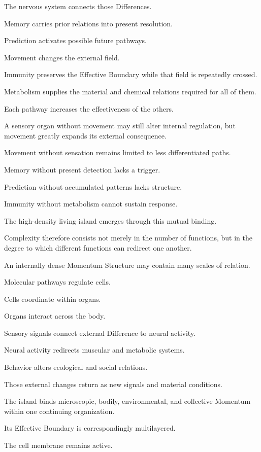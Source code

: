 The nervous system connects those Differences.

Memory carries prior relations into present resolution.

Prediction activates possible future pathways.

Movement changes the external field.

Immunity preserves the Effective Boundary while that field is repeatedly crossed.

Metabolism supplies the material and chemical relations required for all of them.

Each pathway increases the effectiveness of the others.

A sensory organ without movement may still alter internal regulation, but movement greatly expands its external consequence.

Movement without sensation remains limited to less differentiated paths.

Memory without present detection lacks a trigger.

Prediction without accumulated patterns lacks structure.

Immunity without metabolism cannot sustain response.

The high-density living island emerges through this mutual binding.

Complexity therefore consists not merely in the number of functions, but in the degree to which different functions can redirect one another.

An internally dense Momentum Structure may contain many scales of relation.

Molecular pathways regulate cells.

Cells coordinate within organs.

Organs interact across the body.

Sensory signals connect external Difference to neural activity.

Neural activity redirects muscular and metabolic systems.

Behavior alters ecological and social relations.

Those external changes return as new signals and material conditions.

The island binds microscopic, bodily, environmental, and collective Momentum within one continuing organization.

Its Effective Boundary is correspondingly multilayered.

The cell membrane remains active.

